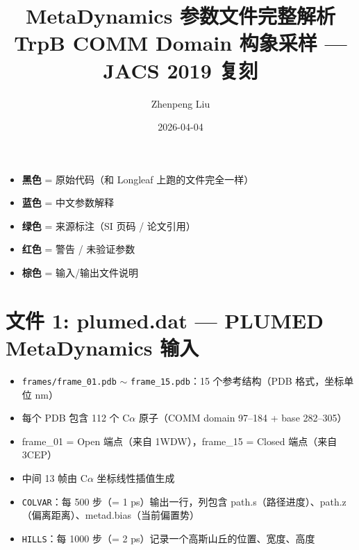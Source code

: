 \documentclass[11pt,a4paper]{article}
\title{\textbf{MetaDynamics 参数文件完整解析}\\[5pt]
\large TrpB COMM Domain 构象采样 — JACS 2019 复刻}
\author{Zhenpeng Liu}
\date{2026-04-04}
\begin{document}
\maketitle

\begin{notebox}[颜色说明]
\begin{itemize}[nosep]
\item \textcolor{paramcolor}{\textbf{黑色}} = 原始代码（和 Longleaf 上跑的文件完全一样）
\item \textcolor{notecolor}{\textbf{蓝色}} = 中文参数解释
\item \textcolor{sourcecolor}{\textbf{绿色}} = 来源标注（SI 页码 / 论文引用）
\item \textcolor{warncolor}{\textbf{红色}} = 警告 / 未验证参数
\item \textcolor{iocolor}{\textbf{棕色}} = 输入/输出文件说明
\end{itemize}
\end{notebox}

\section{文件 1: plumed.dat — PLUMED MetaDynamics 输入}

\begin{iobox}[输入文件]
\begin{itemize}[nosep]
\item \texttt{frames/frame\_01.pdb} $\sim$ \texttt{frame\_15.pdb}：15 个参考结构（PDB 格式，坐标单位 nm）
\item 每个 PDB 包含 112 个 C$\alpha$ 原子（COMM domain 97--184 + base 282--305）
\item frame\_01 = Open 端点（来自 1WDW），frame\_15 = Closed 端点（来自 3CEP）
\item 中间 13 帧由 C$\alpha$ 坐标线性插值生成
\end{itemize}
\end{iobox}

\begin{iobox}[输出文件]
\begin{itemize}[nosep]
\item \texttt{COLVAR}：每 500 步（= 1 ps）输出一行，列包含 path.s（路径进度）、path.z（偏离距离）、metad.bias（当前偏置势）
\item \texttt{HILLS}：每 1000 步（= 2 ps）记录一个高斯山丘的位置、宽度、高度
\end{itemize}
\end{iobox}
\end{document}
